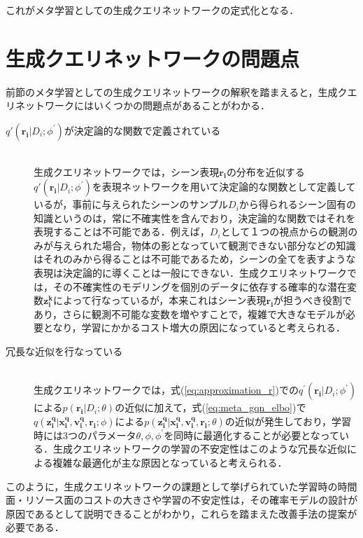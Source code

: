 これがメタ学習としての生成クエリネットワークの定式化となる．

\section{生成クエリネットワークの問題点}
\label{section:problem}
前節のメタ学習としての生成クエリネットワークの解釈を踏まえると，生成クエリネットワークにはいくつかの問題点があることがわかる．
\begin{description}
\item[$q\prime \left( \bm{r_i} | D_i ; {\phi}^\prime \right)$が決定論的な関数で定義されている]\mbox{}\\
生成クエリネットワークでは，シーン表現$\bm{r_i}$の分布を近似する$q\prime \left( \bm{r_i} | D_i ; {\phi}^\prime \right)$を表現ネットワークを用いて決定論的な関数として定義しているが，事前に与えられたシーンのサンプル$D_i$から得られるシーン固有の知識というのは，常に不確実性を含んでおり，決定論的な関数ではそれを表現することは不可能である．例えば，$D_i$として１つの視点からの観測のみが与えられた場合，物体の影となっていて観測できない部分などの知識はそれのみから得ることは不可能であるため，シーンの全てを表すような表現は決定論的に導くことは一般にできない．生成クエリネットワークでは，その不確実性のモデリングを個別のデータに依存する確率的な潜在変数$\bm{z_i^k}$によって行なっているが，本来これはシーン表現$\bm{r_i}$が担うべき役割であり，さらに観測不可能な変数を増やすことで，複雑で大きなモデルが必要となり，学習にかかるコスト増大の原因になっていると考えられる．
\item[冗長な近似を行なっている]\mbox{}\\
生成クエリネットワークでは，式(\ref{eq:approximation_r})での$q^\prime ( \bm{r_i} | D_i ; {\phi}^\prime )$による$p( \bm{r_i} | D_i ; \theta )$の近似に加えて，式(\ref{eq:meta_gqn_elbo})で$q(\bm{z_i^q}|\bm{x_i^q}, \bm{v_i^q}, \bm{r_i}; \phi)$による$p(\bm{z_i^q}|\bm{x_i^q}, \bm{v_i^q}, \bm{r_i}; \theta)$の近似が発生しており，学習時には3つのパラメータ$\theta, \phi, {\phi}^\prime$を同時に最適化することが必要となっている．生成クエリネットワークの学習の不安定性はこのような冗長な近似による複雑な最適化が主な原因となっていると考えられる．
\end{description}

このように，生成クエリネットワークの課題として挙げられていた学習時の時間面・リソース面のコストの大きさや学習の不安定性は，その確率モデルの設計が原因であるとして説明できることがわかり，これらを踏まえた改善手法の提案が必要である．

